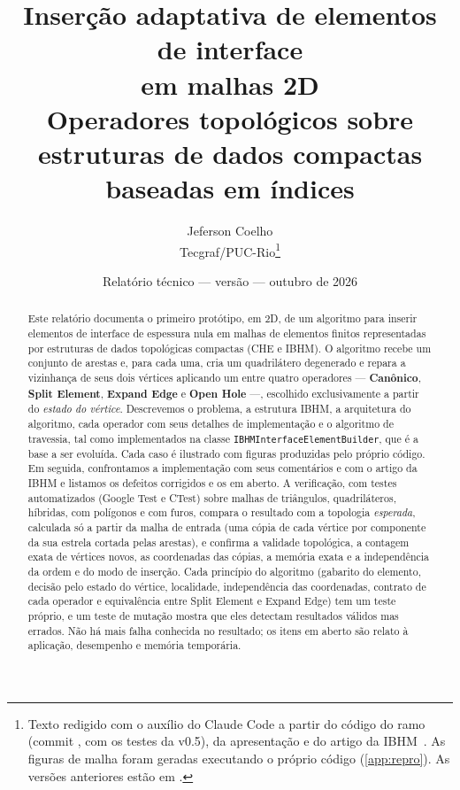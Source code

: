 \documentclass[11pt,a4paper]{article}
\title{\textbf{Inserção adaptativa de elementos de interface}\\ \textbf{em malhas 2D}\\[4pt]
  \large Operadores topológicos sobre estruturas de dados compactas baseadas em índices}
\author{Jeferson Coelho\\ \small Tecgraf/PUC-Rio\thanks{Texto redigido com o auxílio do Claude Code a partir do
  código do ramo \code{feature/edge-element-insertion} (commit \code{97dcfb7}, com os testes da v0.5), da apresentação
  \code{doc/ppt/Operators\_Template} e do artigo da IBHM~\cite{ibhm}. As figuras de malha foram geradas executando o
  próprio código (\cref{app:repro}). As versões anteriores estão em \code{doc/report/historico/}.}}
\date{Relatório técnico — versão \versao{} — outubro de 2026}
\newcommand{\code}[1]{\texttt{\small #1}}
\newcommand{\opname}[1]{\textsf{\bfseries #1}}
\begin{document}
\maketitle

\begin{abstract}
\noindent Este relatório documenta o primeiro protótipo, em 2D, de um algoritmo para inserir elementos de interface de
espessura nula em malhas de elementos finitos representadas por estruturas de dados topológicas compactas (CHE e
IBHM). O algoritmo recebe um conjunto de arestas e, para cada uma, cria um quadrilátero degenerado e repara a vizinhança
de seus dois vértices aplicando um entre quatro operadores --- \opname{Canônico}, \opname{Split Element},
\opname{Expand Edge} e \opname{Open Hole} ---, escolhido exclusivamente a partir do \emph{estado do vértice}.
Descrevemos o problema, a estrutura IBHM, a arquitetura do algoritmo, cada operador com seus detalhes de implementação e
o algoritmo de travessia, tal como implementados na classe \code{IBHMInterfaceElementBuilder}, que é a base a ser
evoluída. Cada caso é ilustrado com figuras produzidas pelo próprio código. Em seguida, confrontamos a implementação com
seus comentários e com o artigo da IBHM e listamos os defeitos corrigidos e os em aberto. A verificação, com testes
automatizados (Google Test e CTest) sobre malhas de triângulos, quadriláteros, híbridas, com polígonos e com furos,
compara o resultado com a topologia \emph{esperada}, calculada só a partir da malha de entrada (uma cópia de cada vértice
por componente da sua estrela cortada pelas arestas), e confirma a validade topológica, a contagem exata de vértices
novos, as coordenadas das cópias, a memória exata e a independência da ordem e do modo de inserção. Cada princípio do
algoritmo (gabarito do elemento, decisão pelo estado do vértice, localidade, independência das coordenadas, contrato de
cada operador e equivalência entre Split Element e Expand Edge) tem um teste próprio, e um teste de mutação mostra que
eles detectam resultados válidos mas errados. Não há mais falha conhecida no resultado; os itens em aberto são relato à
aplicação, desempenho e memória temporária.
\end{abstract}
\end{document}
